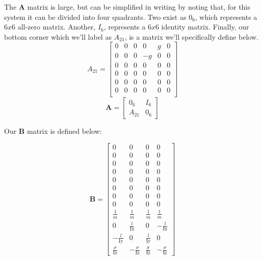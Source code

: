 \documentclass{article}
\begin{document}
The $\boldsymbol{A}$ matrix is large, but can be simplified in writing by noting that, for this system it can be divided into four quadrants. Two exist as $0_6$, which represents a $6x6$ all-zero matrix. Another, $I_6$, represents a $6x6$ identity matrix. Finally, our bottom corner which we'll label as $A_{21}$, is a matrix we'll specifically define below.
\begin{equation}
    A_{21} = \begin{bmatrix}
        0 & 0 & 0 & 0 & g & 0 \\
        0 & 0 & 0 & -g & 0 & 0 \\
        0 & 0 & 0 & 0 & 0 & 0 \\
        0 & 0 & 0 & 0 & 0 & 0 \\
        0 & 0 & 0 & 0 & 0 & 0 \\
        0 & 0 & 0 & 0 & 0 & 0 \\
    \end{bmatrix}
\end{equation}
\begin{equation}
    \boldsymbol{A} = \begin{bmatrix}
        0_6 & I_6 \\
        A_{21} & 0_6
    \end{bmatrix}
\end{equation}

Our $\boldsymbol{B}$ matrix is defined below:

\begin{equation}
    \boldsymbol{B} =
    \begin{bmatrix}
        0 & 0 & 0 & 0\\
        0 & 0 & 0 & 0\\
        0 & 0 & 0 & 0\\
        0 & 0 & 0 & 0\\
        0 & 0 & 0 & 0\\
        0 & 0 & 0 & 0\\
        0 & 0 & 0 & 0\\
        0 & 0 & 0 & 0\\
        \frac{1}{m} & \frac{1}{m} & \frac{1}{m} & \frac{1}{m}\\
        0 & \frac{l}{\mathrm{Ix}} & 0 & -\frac{l}{\mathrm{Ix}}\\
        -\frac{l}{\mathrm{Iy}} & 0 & \frac{l}{\mathrm{Iy}} & 0\\
        \frac{\sigma }{\mathrm{Iz}} & -\frac{\sigma }{\mathrm{Iz}} & \frac{\sigma }{\mathrm{Iz}} & -\frac{\sigma }{\mathrm{Iz}}
        \end{bmatrix}
\end{equation}
\end{document}
